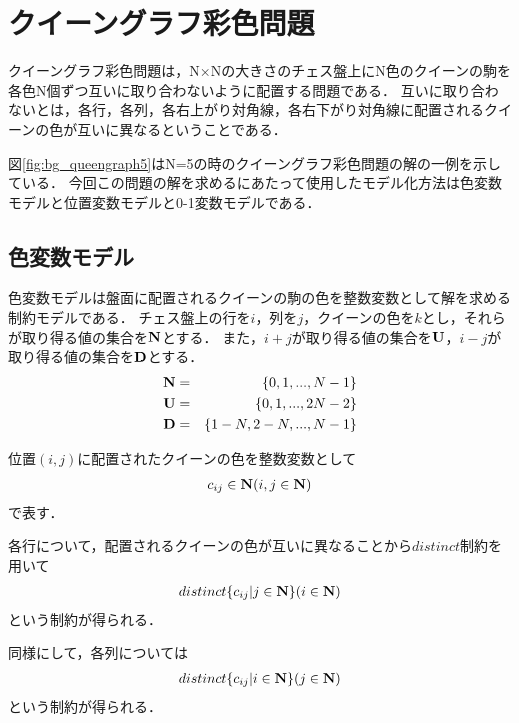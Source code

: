 \chapter{クイーングラフ彩色問題}\label{sec:bg}

クイーングラフ彩色問題は，N×Nの大きさのチェス盤上にN色のクイーンの駒を各色N個ずつ互いに取り合わないように配置する問題である．
互いに取り合わないとは，各行，各列，各右上がり対角線，各右下がり対角線に配置されるクイーンの色が互いに異なるということである．

\label{fig:bg_queengraph5}

図\ref{fig:bg_queengraph5}はN=5の時のクイーングラフ彩色問題の解の一例を示している．
今回この問題の解を求めるにあたって使用したモデル化方法は色変数モデルと位置変数モデルと0-1変数モデルである．


\section{色変数モデル}\label{sec:bg_col}
色変数モデルは盤面に配置されるクイーンの駒の色を整数変数として解を求める制約モデルである．
チェス盤上の行を$i$，列を$j$，クイーンの色を$k$とし，それらが取り得る値の集合を$\bf N$とする．
また，$i+j$が取り得る値の集合を$\bf U$，$i-j$が取り得る値の集合を$\bf D$とする．
\begin{eqnarray}
    {\bf N} & = &\{0,1,...,N-1\} \nonumber \\
    {\bf U} & = &\{0,1,...,2N-2\} \nonumber \\
    {\bf D} & = &\{1-N,2-N,...,N-1\} \nonumber
\end{eqnarray}

位置$(i,j)$に配置されたクイーンの色を整数変数として
\begin{eqnarray}
    c_{ij} \in {\bf N} (i,j \in {\bf N}) \label{eq:bg_col_1}
\end{eqnarray}
で表す．

各行について，配置されるクイーンの色が互いに異なることから$distinct$制約を用いて
\begin{eqnarray}
    distinct\{c_{ij} | j \in {\bf N} \} (i \in {\bf N}) \label{eq:bg_col_2}
\end{eqnarray}
という制約が得られる．

同様にして，各列については
\begin{eqnarray}
    distinct\{c_{ij} | i \in {\bf N} \} (j \in {\bf N}) \label{eq:bg_col_3}
\end{eqnarray}
という制約が得られる．

